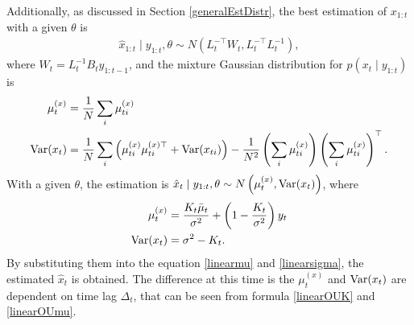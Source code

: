 Additionally, as discussed in Section \ref{generalEstDistr}, the best estimation of $x_{1:t}$ with a given $\theta$ is 
\begin{align*}
\hat{x}_{1:t} \mid y_{1:t},\theta \sim N\left(L_t^{-\top}W_t,L_t^{-\top}L_t^{-1}\right),
\end{align*}
where $W_t = L_t^{-1}B_{t}y_{1:t-1}$, and the mixture Gaussian distribution for $p(x_t \mid y_{1:t})$ is 
\begin{align}
\mu_t^{(x)} &= \frac{1}{N} \sum_i \mu_{ti}^{(x)}  \\
\mathrm{Var}(x_t) &= \frac{1}{N} \sum_i \left( \mu_{ti}^{(x)}  \mu_{ti}^{(x)\top} +\mathrm{Var}(x_{ti})\right) -\frac{1}{N^2} \left(  \sum_i  \mu_{ti}^{(x)} \right) \left( \sum_i \mu_{ti}^{(x)} \right) ^\top.
\end{align}
With a given $\theta$, the estimation is $\hat{x}_{t}\mid y_{1:t},\theta \sim N\left(\mu_{t}^{(x)},\mathrm{Var}(x_t)\right)$, where
\begin{align*}
\mu_{t}^{(x)} &  =  \frac{K_{t}\bar{\mu}_{t}}{\sigma^2}+\left(1-\frac{K_{t}}{\sigma^2}\right)y_{t} \\
\mathrm{Var}(x_t)&= \sigma^2-K_{t}.
\end{align*}
By substituting them into the equation \eqref{linearmu} and \eqref{linearsigma}, the estimated $\hat{x}_t$ is obtained. The difference at this time is the $\mu_{t}^{(x)}$ and $\mathrm{Var}(x_t)$ are dependent on time lag $\Delta_t$, that can be seen from formula \eqref{linearOUK} and \eqref{linearOUmu}. 


